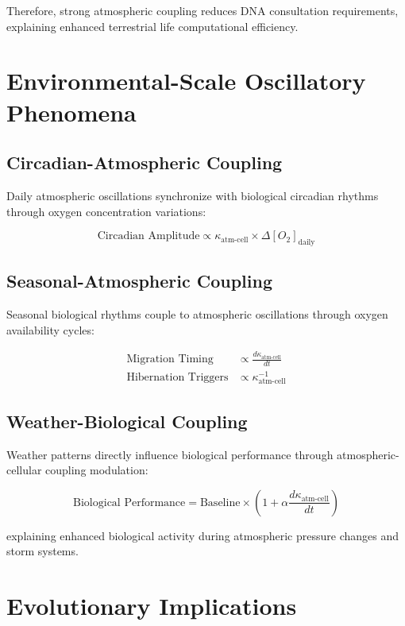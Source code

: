 \documentclass[twocolumn]{article}
\begin{document}
Therefore, strong atmospheric coupling reduces DNA consultation requirements, explaining enhanced terrestrial life computational efficiency.

\section{Environmental-Scale Oscillatory Phenomena}

\subsection{Circadian-Atmospheric Coupling}

Daily atmospheric oscillations synchronize with biological circadian rhythms through oxygen concentration variations:

\begin{equation}
\text{Circadian Amplitude} \propto \kappa_{\text{atm-cell}} \times \Delta[O_2]_{\text{daily}}
\end{equation}

\subsection{Seasonal-Atmospheric Coupling}

Seasonal biological rhythms couple to atmospheric oscillations through oxygen availability cycles:

\begin{align}
\text{Migration Timing} &\propto \frac{d\kappa_{\text{atm-cell}}}{dt} \\
\text{Hibernation Triggers} &\propto \kappa_{\text{atm-cell}}^{-1}
\end{align}

\subsection{Weather-Biological Coupling}

Weather patterns directly influence biological performance through atmospheric-cellular coupling modulation:

\begin{equation}
\text{Biological Performance} = \text{Baseline} \times \left(1 + \alpha \frac{d\kappa_{\text{atm-cell}}}{dt}\right)
\end{equation}

explaining enhanced biological activity during atmospheric pressure changes and storm systems.

\section{Evolutionary Implications}
\end{document}
